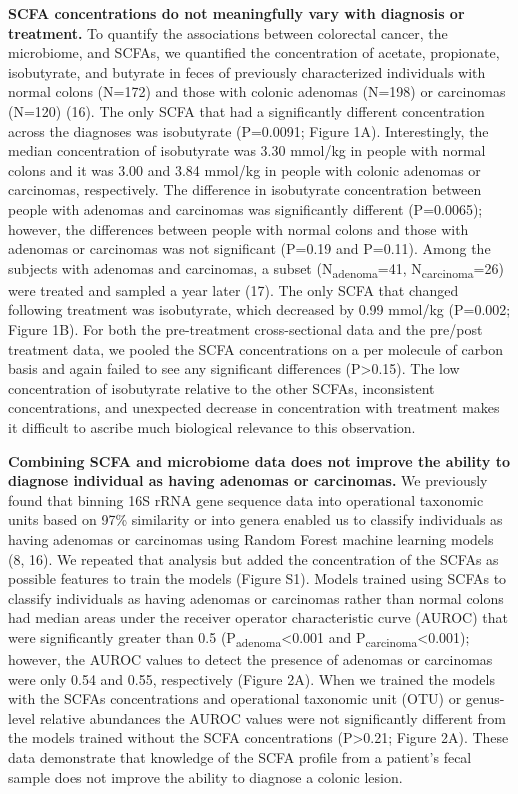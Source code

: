 \documentclass[11pt,]{article}
\begin{document}
\textbf{SCFA concentrations do not meaningfully vary with diagnosis or
treatment.} To quantify the associations between colorectal cancer, the
microbiome, and SCFAs, we quantified the concentration of acetate,
propionate, isobutyrate, and butyrate in feces of previously
characterized individuals with normal colons (N=172) and those with
colonic adenomas (N=198) or carcinomas (N=120) (16). The only SCFA that
had a significantly different concentration across the diagnoses was
isobutyrate (P=0.0091; Figure 1A). Interestingly, the median
concentration of isobutyrate was 3.30 mmol/kg in people with normal
colons and it was 3.00 and 3.84 mmol/kg in people with colonic adenomas
or carcinomas, respectively. The difference in isobutyrate concentration
between people with adenomas and carcinomas was significantly different
(P=0.0065); however, the differences between people with normal colons
and those with adenomas or carcinomas was not significant (P=0.19 and
P=0.11). Among the subjects with adenomas and carcinomas, a subset
(N\textsubscript{adenoma}=41, N\textsubscript{carcinoma}=26) were
treated and sampled a year later (17). The only SCFA that changed
following treatment was isobutyrate, which decreased by 0.99 mmol/kg
(P=0.002; Figure 1B). For both the pre-treatment cross-sectional data
and the pre/post treatment data, we pooled the SCFA concentrations on a
per molecule of carbon basis and again failed to see any significant
differences (P\textgreater{}0.15). The low concentration of isobutyrate
relative to the other SCFAs, inconsistent concentrations, and unexpected
decrease in concentration with treatment makes it difficult to ascribe
much biological relevance to this observation.

\textbf{Combining SCFA and microbiome data does not improve the ability
to diagnose individual as having adenomas or carcinomas.} We previously
found that binning 16S rRNA gene sequence data into operational
taxonomic units based on 97\% similarity or into genera enabled us to
classify individuals as having adenomas or carcinomas using Random
Forest machine learning models (8, 16). We repeated that analysis but
added the concentration of the SCFAs as possible features to train the
models (Figure S1). Models trained using SCFAs to classify individuals
as having adenomas or carcinomas rather than normal colons had median
areas under the receiver operator characteristic curve (AUROC) that were
significantly greater than 0.5 (P\textsubscript{adenoma}\textless{}0.001
and P\textsubscript{carcinoma}\textless{}0.001); however, the AUROC
values to detect the presence of adenomas or carcinomas were only 0.54
and 0.55, respectively (Figure 2A). When we trained the models with the
SCFAs concentrations and operational taxonomic unit (OTU) or genus-level
relative abundances the AUROC values were not significantly different
from the models trained without the SCFA concentrations
(P\textgreater{}0.21; Figure 2A). These data demonstrate that knowledge
of the SCFA profile from a patient's fecal sample does not improve the
ability to diagnose a colonic lesion.
\end{document}
